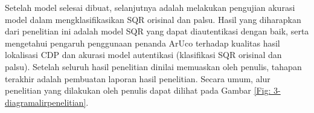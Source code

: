 Setelah model selesai dibuat, selanjutnya adalah melakukan pengujian akurasi model dalam mengklasifikasikan SQR orisinal dan palsu. Hasil yang diharapkan dari
penelitian ini adalah model SQR yang dapat diautentikasi dengan baik, serta mengetahui pengaruh penggunaan penanda ArUco terhadap kualitas hasil lokalisasi CDP
dan akurasi model autentikasi (klasifikasi SQR orisinal dan palsu). Setelah seluruh hasil penelitian dinilai memuaskan oleh penulis, tahapan terakhir adalah
pembuatan laporan hasil penelitian. Secara umum, alur penelitian yang dilakukan oleh penulis dapat dilihat pada Gambar \ref{Fig: 3-diagramalirpenelitian}.

\clearpage

